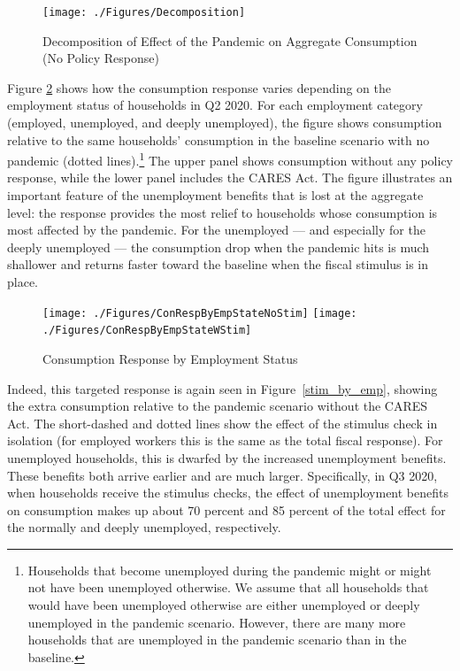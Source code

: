 \documentclass[titlepage,a4paper]{\econtex}
\begin{document}
\begin{figure}
  \centering
  \caption{Decomposition of Effect of the Pandemic on Aggregate Consumption (No Policy Response)}
  \label{cons_response2}
  { \texttt{[image: ./Figures/Decomposition]}}
\end{figure}

Figure \ref{cons_response_emp} shows how the consumption response varies depending on the employment status of households in Q2 2020.
For each employment category (employed, unemployed, and deeply unemployed), the figure shows consumption relative to the same households' consumption in the baseline scenario with no pandemic (dotted lines).\footnote{Households that become unemployed during the pandemic might or might not have been unemployed otherwise. We assume that all households that would have been unemployed otherwise are either unemployed or deeply unemployed in the pandemic scenario. However, there are many more households that are unemployed in the pandemic scenario than in the baseline.}
The upper panel shows consumption without any policy response, while the lower panel includes the CARES Act.
The figure illustrates an important feature of the unemployment benefits that is lost at the aggregate level: the response provides the most relief to households whose consumption is most affected by the pandemic.
For the unemployed --- and especially for the deeply unemployed --- the consumption drop when the pandemic hits is much shallower and returns faster toward the baseline when the fiscal stimulus is in place.

\begin{figure}
  \centering
  \caption{Consumption Response by Employment Status}
  \label{cons_response_emp}
  { \texttt{[image: ./Figures/ConRespByEmpStateNoStim]}
    \texttt{[image: ./Figures/ConRespByEmpStateWStim]}}
\end{figure}

Indeed, this targeted response is again seen in Figure~\ref{stim_by_emp},
showing the extra consumption relative to the pandemic scenario without the CARES Act.
The short-dashed and dotted lines show the effect of the stimulus check in isolation (for employed workers this is the same as the total fiscal response).
For unemployed households, this is dwarfed by the increased unemployment benefits.
These benefits both arrive earlier and are much larger.
Specifically, in Q3 2020, when households receive the stimulus checks, the effect of unemployment benefits on consumption makes up about 70 percent and 85 percent of the total effect for the normally and deeply unemployed, respectively.
\end{document}
